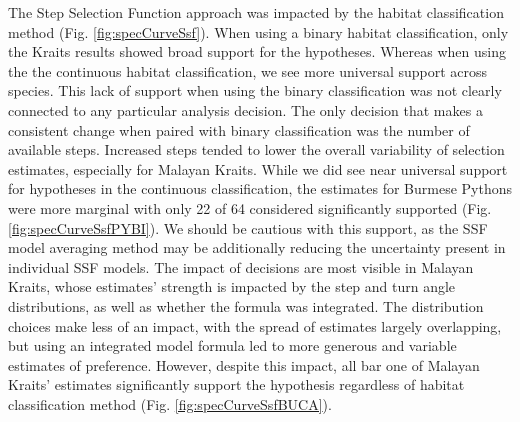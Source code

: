 \documentclass[10pt,a4paper]{article}
\begin{document}
The Step Selection Function approach was impacted by the habitat classification method (Fig. \ref{fig:specCurveSsf}).
When using a binary habitat classification, only the Kraits results showed broad support for the hypotheses.
Whereas when using the the continuous habitat classification, we see more universal support across species.
This lack of support when using the binary classification was not clearly connected to any particular analysis decision.
The only decision that makes a consistent change when paired with binary classification was the number of available steps.
Increased steps tended to lower the overall variability of selection estimates, especially for Malayan Kraits.
While we did see near universal support for hypotheses in the continuous classification, the estimates for Burmese Pythons were more marginal with only 22 of 64 considered significantly supported (Fig. \ref{fig:specCurveSsfPYBI}).
We should be cautious with this support, as the SSF model averaging method may be additionally reducing the uncertainty present in individual SSF models.
The impact of decisions are most visible in Malayan Kraits, whose estimates' strength is impacted by the step and turn angle distributions, as well as whether the formula was integrated.
The distribution choices make less of an impact, with the spread of estimates largely overlapping, but using an integrated model formula led to more generous and variable estimates of preference.
However, despite this impact, all bar one of Malayan Kraits' estimates significantly support the hypothesis regardless of habitat classification method (Fig. \ref{fig:specCurveSsfBUCA}).
\end{document}
